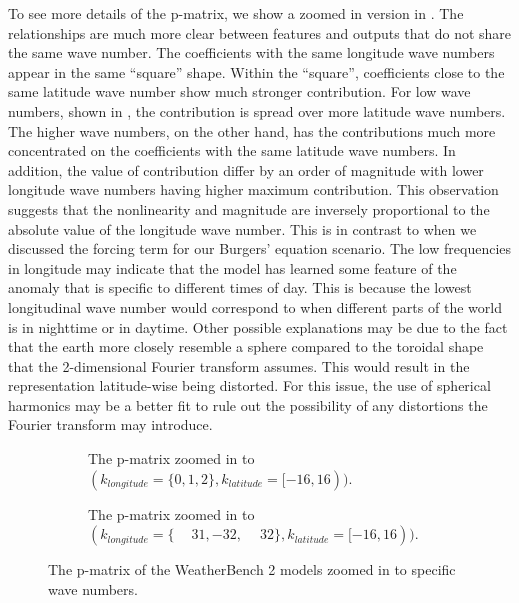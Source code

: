 To see more details of the p-matrix, we show a zoomed in version in . The relationships are much more clear between features and outputs that do not share the same wave number. The coefficients with the same longitude wave numbers appear in the same \enquote{square} shape. Within the \enquote{square}, coefficients close to the same latitude wave number show much stronger contribution. For low wave numbers, shown in , the contribution is spread over more latitude wave numbers. The higher wave numbers, on the other hand, has the contributions much more concentrated on the coefficients with the same latitude wave numbers. In addition, the value of contribution differ by an order of magnitude with lower longitude wave numbers having higher maximum contribution. This observation suggests that the nonlinearity and magnitude are inversely proportional to the absolute value of the longitude wave number. This is in contrast to when we discussed the forcing term for our Burgers' equation scenario. The low frequencies in longitude may indicate that the model has learned some feature of the anomaly that is specific to different times of day. This is because the lowest longitudinal wave number would correspond to when different parts of the world is in nighttime or in daytime. Other possible explanations may be due to the fact that the earth more closely resemble a sphere compared to the toroidal shape that the 2-dimensional Fourier transform assumes. This would result in the representation latitude-wise being distorted. For this issue, the use of spherical harmonics may be a better fit to rule out the possibility of any distortions the Fourier transform may introduce.
\begin{figure}[H]
  \centering
  \begin{subfigure}{\linewidth}
    \begin{adjustbox}{width=\linewidth}
      
    \end{adjustbox}
    \caption{The p-matrix zoomed in to \((k_{longitude}=\{0, 1, 2\}, k_{latitude}=[-16, 16))\).}\label{fig:sc3_pm_zoom1}
  \end{subfigure}
  \begin{subfigure}{\linewidth}
    \begin{adjustbox}{width=\linewidth}
      
    \end{adjustbox}
    \caption{The p-matrix zoomed in to \((k_{longitude}=\{\phantom{-}31,-32,\phantom{-}32\}, k_{latitude}=[-16, 16))\).}\label{fig:sc3_pm_zoom2}
  \end{subfigure}
  \caption{The p-matrix of the WeatherBench 2 models zoomed in to specific wave numbers.}\label{fig:sc3_pm_zoomed}
\end{figure}

